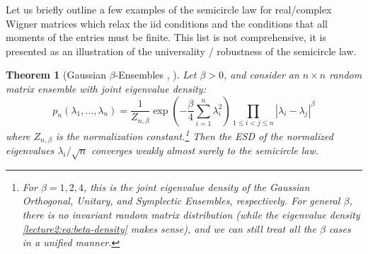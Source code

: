 \documentclass[letterpaper,11pt,oneside,reqno]{book}
\numberwithin{equation}{chapter}  %
\newtheorem{theorem}[proposition]{Theorem}
\theoremstyle{definition}
\begin{document}
Let us briefly outline a few examples
of the semicircle law for real/complex
Wigner matrices which relax the iid conditions and the
conditions that all moments of the entries must be finite.
This list is not comprehensive, it is presented as an illustration of the
universality / robustness of the semicircle law.
\begin{theorem}[Gaussian $\beta$-Ensembles \cite{Johansson_BGG_1998}, \cite{Forrester-LogGas}]
	Let $\beta > 0$, and consider an $n \times n$ random matrix ensemble with joint eigenvalue density:
\begin{equation}
	\label{lecture2:eq:beta-density}
	p_n(\lambda_1,\ldots,\lambda_n) = \frac{1}{Z_{n,\beta}} \exp\left(-\frac{\beta}{4}\sum_{i=1}^n \lambda_i^2\right) \prod_{1\leq i<j\leq n} |\lambda_i-\lambda_j|^\beta
\end{equation}
where $Z_{n,\beta}$ is the normalization constant.\footnote{For
	$\beta=1,2,4$, this is the joint
eigenvalue density of the Gaussian Orthogonal, Unitary, and Symplectic Ensembles, respectively.
For general $\beta$, there is no invariant random matrix distribution
(while the eigenvalue density \eqref{lecture2:eq:beta-density} makes sense), and
we can still treat all the $\beta$ cases in a unified manner.}
Then the ESD of the normalized eigenvalues $\lambda_i/\sqrt n$
converges weakly almost surely to the semicircle law.
\end{theorem}
\end{document}
